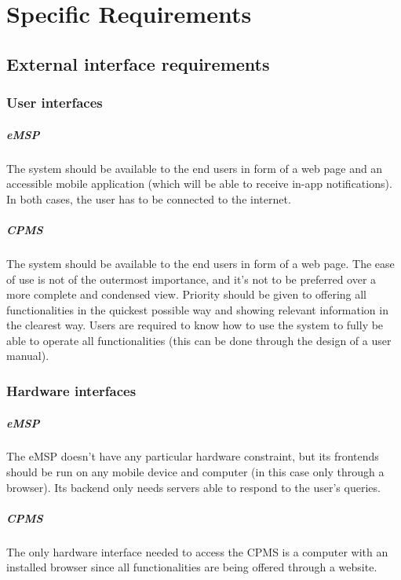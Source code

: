 \chapter{Specific Requirements} \label{requirements}

\section{External interface requirements}

\subsection{User interfaces}

\paragraph{eMSP} The system should be available to the end users in form of a web page and an accessible mobile application (which will be able to receive in-app notifications). In both cases, the user has to be connected to the internet.

\paragraph{CPMS} The system should be available to the end users in form of a web page. The ease of use is not of the outermost importance, and it's not to be preferred over a more complete and condensed view. Priority should be given to offering all functionalities in the quickest possible way and showing relevant information in the clearest way. Users are required to know how to use the system to fully be able to operate all functionalities (this can be done through the design of a user manual).

\subsection{Hardware interfaces}

\paragraph{eMSP} The eMSP doesn't have any particular hardware constraint, but its frontends should be run on any mobile device and computer (in this case only through a browser). Its backend only needs servers able to respond to the user's queries.

\paragraph{CPMS} The only hardware interface needed to access the CPMS is a computer with an installed browser since all functionalities are being offered through a website.

